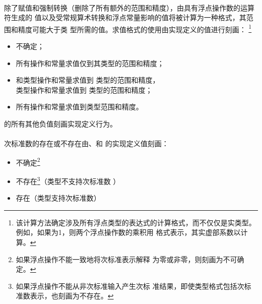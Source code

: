 \paragraph{}
除了赋值和强制转换（删除了所有额外的范围和精度），由具有浮点操作数的运算符生成的
值以及受常规算术转换和浮点常量影响的值将被计算为一种格式，其范围和精度可能大于类
型所需的值。求值格式的使用由实现定义的值进行刻画：
\footnote{该计算方法确定涉及所有浮点类型的表达式的计算格式，而不仅仅是实类型。
例如，如果为1，则两个浮点操作数的乘积用
格式表示，其实虚部系数以计算。}
\begin{itemize}
  \item[]{  \qquad 不确定；}
  \item[]{ \qquad 所有操作和常量求值仅到其类型的范围和精度；}
  \item[]{ \qquad {}和类型操作和常量求值到
    类型的范围和精度，\\
           \qquad {}类型操作和常量求值到
    类型的范围和精度；}
  \item[]{ \qquad 所有操作和常量求值到类型范围和精度。}
\end{itemize}
的所有其他负值刻画实现定义行为。

\paragraph{}
次标准数的存在或不存在由、和
的实现定义值刻画：
\begin{itemize}
  \item[]{  \qquad 不确定\footnote{如果浮点操作不能一致地将次标准表示解释
    为零或非零，则刻画为不可确定。}}
  \item[]{ \qquad 不存在\footnote{如果浮点操作不能从非次标准输入产生次标
    准结果，即使类型格式包括次标准数表示，也刻画为不存在。}（类型不支持次标准数
    ）}
  \item[]{ \qquad 存在（类型支持次标准数）}
\end{itemize}

